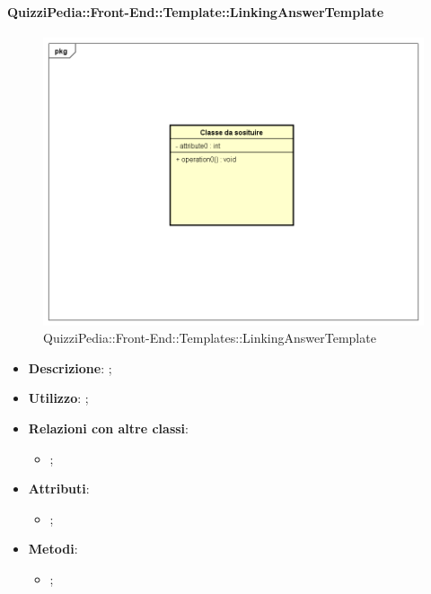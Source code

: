 		\paragraph{QuizziPedia::Front-End::Template::LinkingAnswerTemplate}
		
				\label{QuizziPedia::Front-End::Templates::LinkingAnswerTemplate}

				\begin{figure}[h]
					\centering
					\includegraphics[scale=0.5,keepaspectratio]{UML/Classi/Front-End/Temporanea.png}
					\caption{QuizziPedia::Front-End::Templates::LinkingAnswerTemplate}
				\end{figure}		
		
			\begin{itemize}
				\item \textbf{Descrizione}: ;
				\item \textbf{Utilizzo}: ;
				\item \textbf{Relazioni con altre classi}: 
				\begin{itemize}
					\item ;
				\end{itemize}
				\item \textbf{Attributi}: 
				\begin{itemize}
					\item ;
				\end{itemize}
				\item \textbf{Metodi}: 
				\begin{itemize}
					\item ;
				\end{itemize}
			\end{itemize}
		
